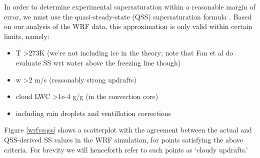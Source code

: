 \documentclass{article}
\begin{document}
In order to determine experimental supersaturation within a reasonable margin of error, we must use the quasi-steady-state (QSS) supersaturation formula \cite{Rogers1989}. Based on our analysis of the WRF data, this approximation is only valid within certain limits, namely:
\begin{itemize}
	\item T \textgreater  273K (we're not including ice in the theory; note that Fan et al do evaluate SS wrt water above the freezing line though)
	\item w \textgreater  2 m/s (reasonably strong updrafts)
	\item cloud LWC \textgreater  1e-4 g/g (in the convection core)
	\item including rain droplets and ventillation corrections
\end{itemize}

Figure \ref{wrfvsqss} shows a scatterplot with the agreement between the actual and QSS-derived SS values in the WRF simulation, for points satisfying the above criteria. For brevity we will henceforth refer to such points as `cloudy updrafts.'

\clearpage
\newpage
\end{document}
